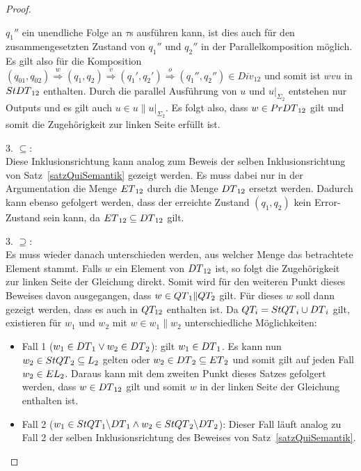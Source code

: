\begin{proof}
\begin{itemize}
\begin{itemize}
          $q_1''$ ein unendliche Folge an $\tau$s ausführen kann, ist dies auch
          für den zusammengesetzten Zustand von $q_1''$ und $q_2''$ in der
          Parallelkomposition möglich. Es gilt also für die Komposition
          $(q_{01},q_{02}) \overset{w}{\Rightarrow} (q_1,q_2)
          \overset{v}{\Rightarrow} (q_1',q_2') \overset{o}{\Rightarrow}
          (q_1'',q_2'')\in Div_{12}$ und somit ist $wvu$ in $StDT{}_{12}$
          enthalten. Durch die parallel Ausführung von $u$ und $u|_{\Sigma _2}$
          entstehen nur Outputs und es gilt auch $u\in u\|u|_{\Sigma _2}$. Es
          folgt also, dass $w\in PrDT{}_{12}$ gilt und somit die Zugehörigkeit
          zur linken Seite erfüllt ist.
      \end{itemize}
  \end{itemize}

  3. \glqq{}$\subseteq$\grqq{}:\\
  Diese Inklusionsrichtung kann analog zum Beweis der selben Inklusionsrichtung
  von Satz~\ref{satzQuiSemantik} gezeigt werden. Es muss dabei nur in der
  Argumentation die Menge $ET{}_{12}$ durch die Menge $DT{}_{12}$ ersetzt
  werden. Dadurch kann ebenso gefolgert werden, dass der erreichte Zustand
  $(q_1,q_2)$ kein Error-Zustand sein kann, da $ET{}_{12}\subseteq DT{}_{12}$
  gilt.

  3. \glqq{}$\supseteq$\grqq{}:\\
  Es muss wieder danach unterschieden werden, aus welcher Menge das betrachtete
  Element stammt. Falls $w$ ein Element von $DT{}_{12}$ ist, so folgt die
  Zugehörigkeit zur linken Seite der Gleichung direkt. Somit wird für den
  weiteren Punkt dieses Beweises davon ausgegangen, dass $w\in QT{}_1\|QT_2$
  gilt. Für dieses $w$ soll dann gezeigt werden, dass es auch in $QT_{12}$
  enthalten ist. Da $QT_i=StQT{}_i\cup DT{}_i$ gilt, existieren für $w_1$
  und $w_2$ mit $w\in w_1\|w_2$ unterschiedliche Möglichkeiten:
  \begin{itemize}
    \item Fall 1 ($w_1\in DT{}_1 \vee w_2\in DT{}_2$): \OBdA{} gilt $w_1\in
      DT{}_1$. Es kann nun $w_2\in StQT{}_2 \subseteq L_2$ gelten oder
      $w_2\in DT{}_2\subseteq ET{}_2$ und somit gilt auf jeden Fall $w_2\in EL{}_2$. Daraus
      kann mit dem zweiten Punkt dieses Satzes gefolgert werden, dass $w\in
      DT{}_{12}$ gilt und somit $w$ in der linken Seite der Gleichung
      enthalten ist.
    \item Fall 2 ($w_1\in StQT{}_1\backslash DT{}_1 \wedge w_2\in StQT{}_2
      \backslash DT{}_2$): Dieser Fall läuft analog zu Fall 2 der selben
      Inklusionsrichtung des Beweises von Satz~\ref{satzQuiSemantik}.
  \end{itemize}
\end{proof}


